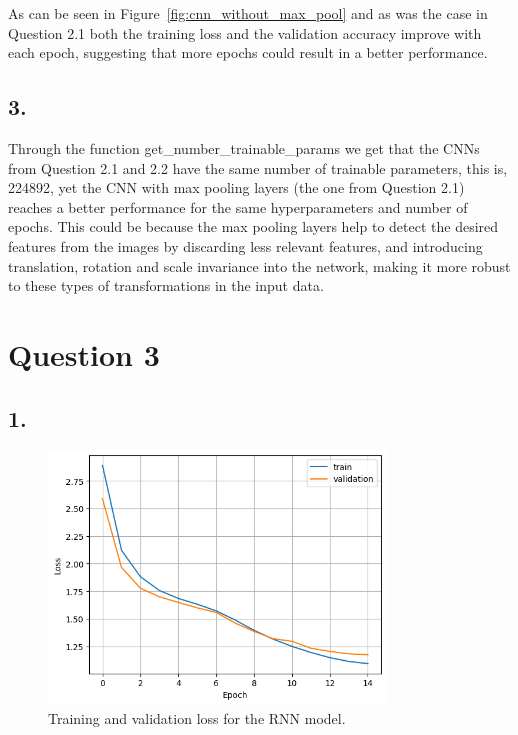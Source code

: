 \documentclass[11pt]{article}
\begin{document}
As can be seen in Figure~\ref{fig:cnn_without_max_pool} and as was the case in Question 2.1 both the training loss and the validation accuracy improve with each epoch, suggesting that more epochs could result in a better performance.
\subsection{3.}
Through the function get\_number\_trainable\_params we get that the CNNs from Question 2.1 and 2.2 have the same number of trainable parameters, this is, 224892, yet the CNN with max pooling layers (the one from Question 2.1) reaches a better performance for the same hyperparameters and number of epochs.
This could be because the max pooling layers help to detect the desired features from the images by discarding less relevant features, and introducing translation, rotation and scale invariance into the network, making it more robust to these types of transformations in the input data.
\section{Question 3}
\subsection{1.}
\begin{figure}[H]
    \centering
    \includegraphics[width=0.8\textwidth]{./plots/recurrent_loss_per_epoch}
    \caption{Training and validation loss for the RNN model.}
    \label{fig:recurrent_loss_per_epoch}
\end{figure}
\end{document}
